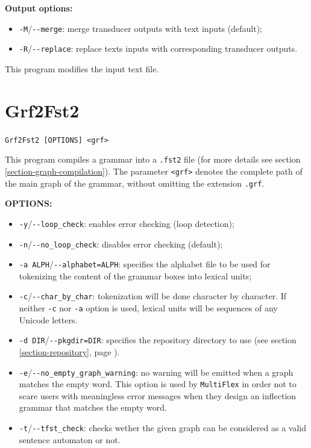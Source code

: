 \bigskip
\noindent \textbf{Output options:}
\begin{itemize}
  \item \verb+-M+/\verb+--merge+: merge transducer outputs with text inputs
  (default);
  \item \verb+-R+/\verb+--replace+: replace texts inputs with corresponding
  transducer outputs.
\end{itemize}

\bigskip
\noindent This program modifies the input text file.







\section{Grf2Fst2}
\verb+Grf2Fst2 [OPTIONS] <grf>+

\bigskip
\noindent {}
This program compiles a grammar into a \verb+.fst2+ file (for more details see
section \ref{section-graph-compilation}). The parameter \verb+<grf>+ 
denotes the complete path of the main graph of the grammar, without omitting the
extension \verb+.grf+.

\bigskip
\noindent \textbf{OPTIONS:}
\begin{itemize}
  \item \verb+-y+/\verb+--loop_check+: enables error checking (loop
  detection);
  \item \verb+-n+/\verb+--no_loop_check+: disables error checking (default);
  \item \verb+-a ALPH+/\verb+--alphabet=ALPH+: specifies the alphabet file to be
  used for tokenizing the content of the grammar boxes into lexical units;
  \item \verb+-c+/\verb+--char_by_char+: tokenization will be done character by
  character. If neither \verb+-c+ nor \verb+-a+ option is used, lexical units 
  will be sequences of any Unicode letters.
  \item \verb+-d DIR+/\verb+--pkgdir=DIR+: specifies the repository directory to
  use (see section \ref{section-repository}, page
  \pageref{section-repository}).
  \item \verb+-e+/\verb+--no_empty_graph_warning+: no warning will be emitted
  when a graph matches the empty word. This option is used by \verb+MultiFlex+
  in order not to scare users with meaningless error messages when they design
  an inflection grammar that matches the empty word. 
  \item \verb+-t+/\verb+--tfst_check+: checks wether the given graph can be
  considered as a valid sentence automaton or not.
\end{itemize}

